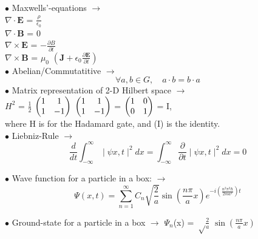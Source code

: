 \documentclass[a4paper, 10pt, onepage]{elegantbook}
\begin{document}
{$\bullet$ Maxwells'-equations $\longrightarrow$  \\
\noindent
$\nabla \cdot \mathbf E$ = $ \frac{\rho}{\epsilon_0}$ \\
$\nabla \cdot \mathbf B$ = 0  \\
$\nabla \times \mathbf E$ = $ - \frac{\partial B}{\partial t}$ \\
$\nabla \times \mathbf B$ = $\mu_0$  $\left( \mathbf {J} + \epsilon_0 \frac{\partial \mathbf E}{\partial t} \right)$  \\

$\bullet$ Abelian/Commutatitive $\longrightarrow$
\begin{equation} \label{eq:Abelian/Commutatitive}
\forall a,b \in G, \quad a \cdot b = b \cdot a
\end{equation}
$\bullet$ Matrix representation of 2-D Hilbert space $\longrightarrow$  \\ 

$H^2$ = $\frac{1}{2}$ $\begin{pmatrix}1 & 1 \cr 1 & -1 \end{pmatrix}$ $\begin{pmatrix}1 & 1 \cr 1 & -1 \end{pmatrix}$ = $\begin{pmatrix}1 & 0 \cr 0 & 1 \end{pmatrix}$ = I,  \\  

where H is for the Hadamard gate, and (I) is the identity.  \\

$\bullet$ Liebniz-Rule $\longrightarrow$  \\
\begin{equation}
\frac{d}{dt} \int_{- \infty}^\infty \mid \psi{x,t} \mid^2 dx = \int_{- \infty}^\infty \frac{\partial}{\partial t} \mid \psi{x,t} \mid^2 dx = 0
\end{equation}

$\bullet$ Wave function for a particle in a box: $\longrightarrow$
\begin{equation}
\Psi(x,t) = \sum_{n=1}^\infty C_n \sqrt{\frac{2}{a}} \sin(\frac{n \pi}{a}x) e^{- i\left( \frac{n^2 \pi^2 \hbar}{2m {a}^2} \right)t}
\end{equation}

$\bullet$ Ground-state for a particle in a box $\longrightarrow$ $\Psi_n$(x) = ${\sqrt \frac{2}{a}}$ $\sin \left( \frac{n \pi}{a}x \right)$  \\

}
\end{document}
